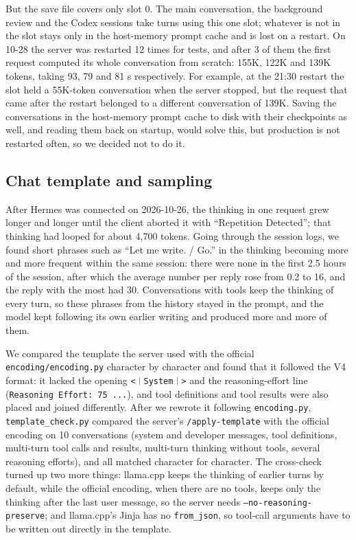 \documentclass[11pt,a4paper]{article}
\newcommand{\code}[1]{\texttt{#1}}
\newcommand{\ctok}[1]{\mbox{\xeCJKsetup{CJKecglue={}}\code{#1}}}
\begin{document}
But the save file covers only slot 0. The main conversation, the background review and the Codex sessions take turns using this one slot; whatever is not in the slot stays only in the host-memory prompt cache and is lost on a restart. On 10-28 the server was restarted 12 times for tests, and after 3 of them the first request computed its whole conversation from scratch: 155K, 122K and 139K tokens, taking 93, 79 and 81 s respectively. For example, at the 21:30 restart the slot held a 55K-token conversation when the server stopped, but the request that came after the restart belonged to a different conversation of 139K. Saving the conversations in the host-memory prompt cache to disk with their checkpoints as well, and reading them back on startup, would solve this, but production is not restarted often, so we decided not to do it.

\subsection{Chat template and sampling}
\label{sec:template}

After Hermes was connected on 2026-10-26, the thinking in one request grew longer and longer until the client aborted it with ``Repetition Detected''; that thinking had looped for about 4,700 tokens. Going through the session logs, we found short phrases such as ``Let me write. / Go.'' in the thinking becoming more and more frequent within the same session: there were none in the first 2.5 hours of the session, after which the average number per reply rose from 0.2 to 16, and the reply with the most had 30. Conversations with tools keep the thinking of every turn, so these phrases from the history stayed in the prompt, and the model kept following its own earlier writing and produced more and more of them.

We compared the template the server used with the official \code{encoding/encoding.py} character by character and found that it followed the V4 format: it lacked the opening \ctok{<｜System｜>} and the reasoning-effort line (\code{Reasoning Effort: 75 ...}), and tool definitions and tool results were also placed and joined differently. After we rewrote it following \code{encoding.py}, \code{template\_check.py} compared the server's \code{/apply-template} with the official encoding on 10 conversations (system and developer messages, tool definitions, multi-turn tool calls and results, multi-turn thinking without tools, several reasoning efforts), and all matched character for character. The cross-check turned up two more things: llama.cpp keeps the thinking of earlier turns by default, while the official encoding, when there are no tools, keeps only the thinking after the last user message, so the server needs \code{--no-reasoning-preserve}; and llama.cpp's Jinja has no \code{from\_json}, so tool-call arguments have to be written out directly in the template.
\end{document}
